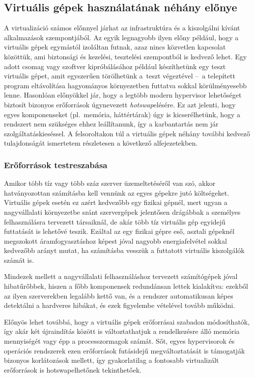 \subsection{Virtuális gépek használatának néhány előnye}
A virtualizáció számos előnnyel járhat az infrastruktúra és a kiszolgálni kívánt alkalmazások szempontjából. Az egyik legnagyobb ilyen előny például, hogy a virtuális gépek egymástól izoláltan futnak, azaz nincs közvetlen kapcsolat közöttük, ami biztonsági és kezelési, tesztelési szempontból is kedvező lehet. Egy adott csomag vagy szoftver kipróbálásához például készíthetünk egy teszt virtuális gépet, amit egyszerűen törölhetünk a~teszt végeztével --~a telepített program eltávolítása hagyományos környezetben futtatva sokkal körülményesebb lenne. Hasonlóan előnyökkel jár, hogy a legtöbb modern \gls{hypervisor} lehetőséget biztosít bizonyos erőforrások úgynevezett \textit{\gls{hotswap}}elésére. Ez azt jelenti, hogy egyes komponenseket (pl.~memória, háttértárak) úgy is kicserélhetünk, hogy a rendszert nem szükséges ehhez leállítanunk, így a karbantartás nem jár szolgáltatáskieséssel. A felsoroltakon túl a virtuális gépek néhány további kedvező tulajdonságát ismertetem részletesen a következő alfejezetekben.

\subsubsection{Erőforrások testreszabása}
Amikor több tíz vagy több száz szerver üzemeltetéséről van szó, akkor hatványozottan számításba kell vennünk az egyes gépekre jutó költségeket. Virtuális gépek esetén ez azért kedvezőbb egy fizikai gépnél, mert ugyan a nagyvállalati környezetbe szánt szervergépek jelentősen drágábbak a személyes felhasználásra tervezett társaiknál, de akár több tíz virtuális gép egyidejű futtatását is lehetővé teszik. Ezáltal az egy fizikai gépre eső, asztali gépeknél megszokott áramfogyasztáshoz képest jóval nagyobb energiafelvétel sokkal kedvezőbb arányt mutat, ha számításba vesszük a futtatott virtuális kiszolgálók számát is.

Mindezek mellett a nagyvállalati felhasználáshoz tervezett számítógépek jóval hibatűrőbbek, hiszen a főbb komponensek redundánsan lettek kialakítva: ezekből az ilyen szerverekben legalább kettő van, és a rendszer automatikusan képes detektálni a hardveres hibákat, és ezek figyelembe vételével tovább működni.

Előnyös lehet továbbá, hogy a virtuális gépek erőforrásai szabadon módosíthatók, így akár két újraindítás között is változtathatjuk a rendelkezésre álló memória mennyiségét vagy épp a processzormagok számát. Sőt, egyes \gls{hypervisor}ok és operációs rendszerek ezen erőforrások futásidejű megváltoztatását is támogatják bizonyos korlátozások mellett, így gyakorlatilag a fontosabb virtualizált erőforrások is \gls{hotswap}elhetőnek tekinthetőek.

